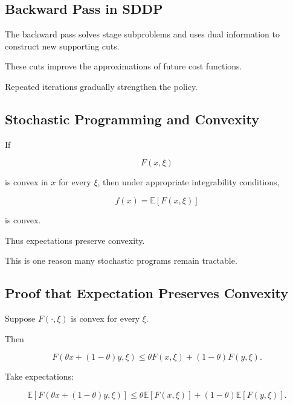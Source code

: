 \subsection{Backward Pass in SDDP}
\label{subsec:sddp-backward-pass}

The backward pass solves stage subproblems and uses dual information to
construct new supporting cuts.

These cuts improve the approximations of future cost functions.

Repeated iterations gradually strengthen the policy.

\subsection{Stochastic Programming and Convexity}
\label{subsec:stochastic-programming-convexity}

If

\[
F(x,\xi)
\]

is convex in \(x\) for every \(\xi\), then under appropriate integrability
conditions,

\[
\boxed{
f(x)
=
\mathbb{E}
[
F(x,\xi)
]
}
\]

is convex.

Thus expectations preserve convexity.

This is one reason many stochastic programs remain tractable.

\subsection{Proof that Expectation Preserves Convexity}
\label{subsec:expectation-preserves-convexity}

Suppose \(F(\cdot,\xi)\) is convex for every \(\xi\).

Then

\[
F
(
\theta x+(1-\theta)y,
\xi
)
\leq
\theta F(x,\xi)
+
(1-\theta)F(y,\xi).
\]

Take expectations:

\[
\mathbb{E}
[
F
(
\theta x+(1-\theta)y,
\xi
)
]
\leq
\theta
\mathbb{E}
[
F(x,\xi)
]
+
(1-\theta)
\mathbb{E}
[
F(y,\xi)
].
\]


